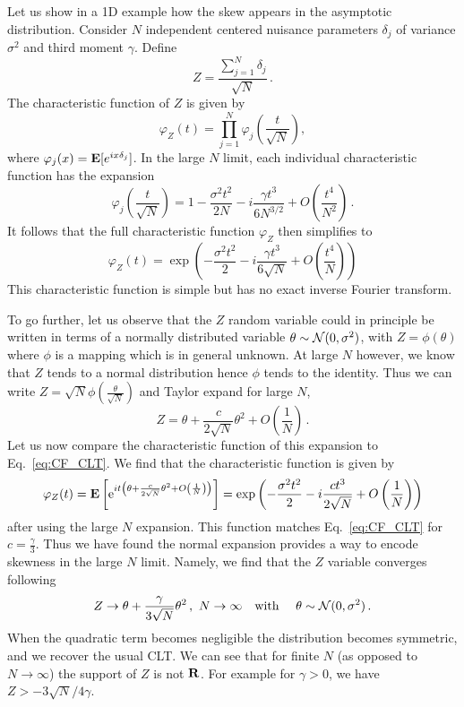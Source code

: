 \documentclass[11pt]{article}
\newcommand{\be}{\begin{equation}}
\newcommand{\ee}{\end{equation}}
\begin{document}
Let us show in a 1D example how the skew appears  in the asymptotic distribution. Consider $N$ independent centered nuisance parameters $\delta_j$ of variance $\sigma^2$ and third moment $\gamma$. Define \be Z=\frac{\sum_{j=1}^N \delta_j}{\sqrt{N}}\,.
\ee
The characteristic function of $Z$ is given by
\be
\varphi_Z(t)=\prod_{j=1}^N\varphi_{j}\left(\frac{t}{\sqrt{N}}\right),
\ee
where $\varphi_{j}(x) = {\bf E}[e^{ix\delta_{j}}]$.
 In the large $N$ limit, each individual characteristic function has the expansion
\be
\varphi_{j}\left(\frac{t}{\sqrt{N}}\right)= 1-\frac{\sigma^2 t^2}{2N}-i \frac{\gamma t^3}{6 N^{3/2}} +O\left(\frac{t^4}{N^2}\right)\,.
\ee
It follows that the full characteristic function $\varphi_Z$ then simplifies to
\be
\varphi_Z(t)=\exp\left(-\frac{\sigma^2 t^2}{2}-i \frac{\gamma t^3}{6 \sqrt{N}} +O\left(\frac{t^4}{N}\right)\right) \label{eq:CF_CLT}
 \ee
 This characteristic function is simple but has no exact inverse Fourier transform.


To go further, let us observe that the $Z$ random variable could in principle be written in terms of a normally distributed variable $\theta\sim {\cal N}(0,\sigma^2)$,
 with $Z=\phi(\theta)$ where $\phi$ is a mapping which is in general unknown.  At large $N$ however, we know that $Z$ tends to a normal distribution hence $\phi$ tends to the identity. Thus we can write $Z=\sqrt{N}\phi\left(\frac{\theta}{\sqrt{N}}\right)$ and Taylor expand for large $N$,
\be
Z=\theta+\frac{c}{2\sqrt{N}}\theta^2+O\left(\frac{1}{N}\right)\,.
\ee
Let us now compare the characteristic function of  this expansion to Eq.~\eqref{eq:CF_CLT}.
We find that the characteristic function is given by
\be
\varphi_Z(t)={\bf E} \left[ \mathrm{e}^{it \left(\theta+\frac{c}{2\sqrt{N}}\theta^2+O\left(\frac{1}{N}\right)\right)} \right]
=\exp\left(-\frac{\sigma^2 t^2}{2}-i \frac{c t^3}{ 2 \sqrt{N}} +O\left(\frac{1}{N}\right)\right)
\label{eq:CF_exp}
\ee
after using the large $N$ expansion. This function matches Eq.~\eqref{eq:CF_CLT} for $c=\frac{\gamma}{3}$. Thus we have found the normal expansion provides a way to encode skewness in the large $N$ limit. Namely, we find that the $Z$ variable converges following
\be
Z\rightarrow \theta+\frac{\gamma}{3\sqrt{N}}\theta^2\,,\,\,N\rightarrow \infty  \quad \textrm{with } \quad \theta\sim{\cal N}(0,\sigma^2)\,.
\ee
When the quadratic term becomes negligible the distribution becomes symmetric, and we recover the usual CLT.
We can see that  for finite $N$ (as opposed to $N\rightarrow \infty$) the support of $Z$ is not $\bf R$. For example for $\gamma>0$, we have
$Z > -3\sqrt{N}/4\gamma$.
\end{document}
